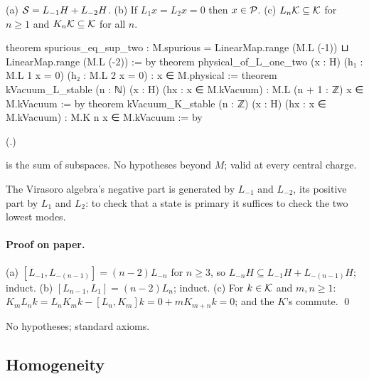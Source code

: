 \begin{theorem}\label{ch18:thm:twogenerators}
(a) $\mathcal{S}=L_{-1}H+L_{-2}H$.  (b) If $L_1x=L_2x=0$ then $x\in\mathcal{P}$.  (c) $L_n\mathcal{K}\subseteq\mathcal{K}$ for $n\ge1$
and $K_n\mathcal{K}\subseteq\mathcal{K}$ for all $n$.
\end{theorem}
\begin{leancode}
theorem spurious_eq_sup_two :
    M.spurious = LinearMap.range (M.L (-1)) ⊔ LinearMap.range (M.L (-2)) := by
theorem physical_of_L_one_two (x : H) (h₁ : M.L 1 x = 0)
    (h₂ : M.L 2 x = 0) : x ∈ M.physical :=
theorem kVacuum_L_stable (n : ℕ) (x : H) (hx : x ∈ M.kVacuum) :
    M.L (n + 1 : ℤ) x ∈ M.kVacuum := by
theorem kVacuum_K_stable (n : ℤ) (x : H) (hx : x ∈ M.kVacuum) :
    M.K n x ∈ M.kVacuum := by
\end{leancode}
(.)
\begin{dictionary}
 is the sum of subspaces.  No hypotheses beyond $M$; valid at every central charge.
\end{dictionary}
\begin{physics}
The Virasoro algebra's negative part is generated by $L_{-1}$ and $L_{-2}$, its positive part by $L_1$
and $L_2$: to check that a state is primary it suffices to check the two lowest modes.
\end{physics}
\paragraph{Proof on paper.}  (a) $[L_{-1},L_{-(n-1)}]=(n-2)L_{-n}$ for $n\ge3$, so $L_{-n}H\subseteq L_{-1}H+L_{-(n-1)}H$;
induct.  (b) $[L_{n-1},L_1]=(n-2)L_n$; induct.  (c) For $k\in\mathcal{K}$ and $m,n\ge1$:
$K_mL_nk=L_nK_mk-[L_n,K_m]k=0+mK_{m+n}k=0$; and the $K$'s commute. \qed
\begin{status}No hypotheses; standard axioms.\end{status}

\subsection{Homogeneity}\label{ch18:sec:grading}


